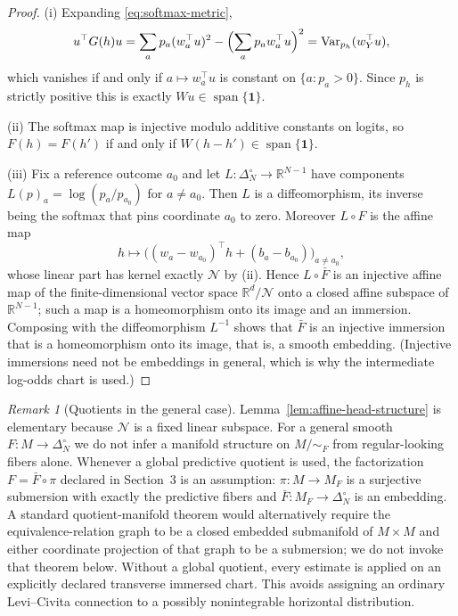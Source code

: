 \documentclass[11pt]{article}
\theoremstyle{definition}
\theoremstyle{remark}
\newtheorem{remark}[theorem]{Remark}
\newcommand{\simplex}{\Delta_{N}^{\circ}}
\newcommand{\R}{\mathbb{R}}
\newcommand{\Var}{\operatorname{Var}}
\begin{document}
\begin{proof}
(i) Expanding \eqref{eq:softmax-metric},
\begin{equation}
    u^\top G(h)u
    =\sum_ap_a(w_a^\top u)^2-\Bigl(\sum_ap_aw_a^\top u\Bigr)^2
    =\Var_{p_h}(w_Y^\top u),
\end{equation}
which vanishes if and only if $a\mapsto w_a^\top u$ is constant on
$\{a:p_a>0\}$. Since $p_h$ is strictly positive this is exactly
$Wu\in\operatorname{span}\{\bm 1\}$.

(ii) The softmax map is injective modulo additive constants on logits, so
$F(h)=F(h')$ if and only if $W(h-h')\in\operatorname{span}\{\bm 1\}$.

(iii) Fix a reference outcome $a_0$ and let $L:\simplex\to\R^{N-1}$ have
components $L(p)_a=\log(p_a/p_{a_0})$ for $a\ne a_0$. Then $L$ is a
diffeomorphism, its inverse being the softmax that pins coordinate $a_0$ to
zero. Moreover $L\circ F$ is the affine map
\begin{equation}
    h\longmapsto
    \bigl((w_a-w_{a_0})^\top h+(b_a-b_{a_0})\bigr)_{a\ne a_0},
\end{equation}
whose linear part has kernel exactly $\mathcal N$ by (ii). Hence
$L\circ\bar F$ is an injective affine map of the finite-dimensional vector
space $\R^d/\mathcal N$ onto a closed affine subspace of $\R^{N-1}$; such a map
is a homeomorphism onto its image and an immersion. Composing with the
diffeomorphism $L^{-1}$ shows that $\bar F$ is an injective immersion that is a
homeomorphism onto its image, that is, a smooth embedding. (Injective
immersions need not be embeddings in general, which is why the intermediate
log-odds chart is used.)
\end{proof}

\begin{remark}[Quotients in the general case]\label{rem:quotient}
Lemma~\ref{lem:affine-head-structure} is elementary because $\mathcal N$ is a
fixed linear subspace. For a general smooth $F:M\to\simplex$ we do not infer a
manifold structure on $M/\!\sim_F$ from regular-looking fibers alone. Whenever
a global predictive quotient is used, the factorization
$F=\bar F\circ\pi$ declared in Section~3 is an assumption: $\pi:M\to M_F$ is a
surjective submersion with exactly the predictive fibers and
$\bar F:M_F\to\simplex$ is an embedding. A standard quotient-manifold theorem
would alternatively require the equivalence-relation graph to be a closed
embedded submanifold of $M\times M$ and either coordinate projection of that
graph to be a submersion; we do not invoke that theorem below. Without a global
quotient, every estimate is applied on an explicitly declared transverse
immersed chart. This avoids assigning an ordinary Levi--Civita connection to a
possibly nonintegrable horizontal distribution.
\end{remark}
\end{document}
